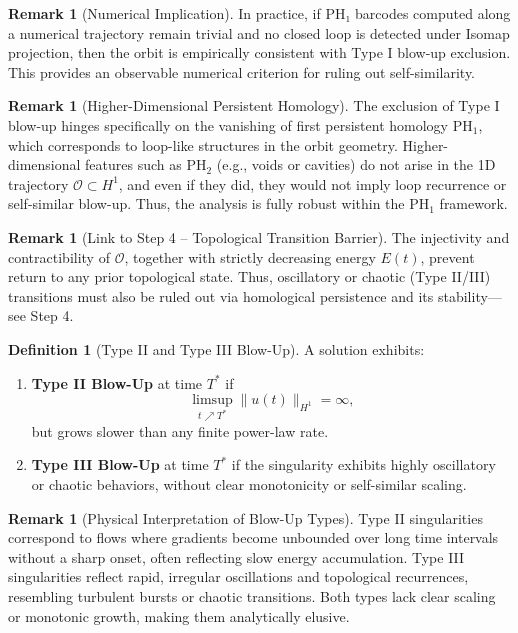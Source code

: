 \documentclass[11pt]{article}
\theoremstyle{definition}
\newtheorem{definition}[theorem]{Definition}
\newtheorem{remark}[theorem]{Remark}
\begin{document}
\begin{remark}[Numerical Implication]
In practice, if PH₁ barcodes computed along a numerical trajectory remain trivial and no closed loop is detected under Isomap projection, then the orbit is empirically consistent with Type I blow-up exclusion. This provides an observable numerical criterion for ruling out self-similarity.
\end{remark}

\begin{remark}[Higher-Dimensional Persistent Homology]
The exclusion of Type I blow-up hinges specifically on the vanishing of first persistent homology $\mathrm{PH}_1$, which corresponds to loop-like structures in the orbit geometry. Higher-dimensional features such as $\mathrm{PH}_2$ (e.g., voids or cavities) do not arise in the 1D trajectory $\mathcal{O} \subset H^1$, and even if they did, they would not imply loop recurrence or self-similar blow-up. Thus, the analysis is fully robust within the $\mathrm{PH}_1$ framework.
\end{remark}

\begin{remark}[Link to Step 4 – Topological Transition Barrier]
The injectivity and contractibility of $\mathcal{O}$, together with strictly decreasing energy $E(t)$, prevent return to any prior topological state. Thus, oscillatory or chaotic (Type II/III) transitions must also be ruled out via homological persistence and its stability—see Step 4.
\end{remark}



\begin{definition}[Type II and Type III Blow-Up]
A solution exhibits:
\begin{enumerate}
  \item \textbf{Type II Blow-Up} at time $T^*$ if
  \[
  \limsup_{t \nearrow T^*} \|u(t)\|_{H^1} = \infty,
  \]
  but grows slower than any finite power-law rate.

  \item \textbf{Type III Blow-Up} at time $T^*$ if the singularity exhibits highly oscillatory or chaotic behaviors, without clear monotonicity or self-similar scaling.
\end{enumerate}
\end{definition}

\begin{remark}[Physical Interpretation of Blow-Up Types]
Type II singularities correspond to flows where gradients become unbounded over long time intervals without a sharp onset, often reflecting slow energy accumulation. Type III singularities reflect rapid, irregular oscillations and topological recurrences, resembling turbulent bursts or chaotic transitions. Both types lack clear scaling or monotonic growth, making them analytically elusive.
\end{remark}
\end{document}
